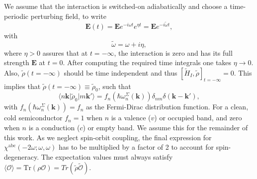 We assume that the interaction is switched-on adiabatically and choose a
time-periodic perturbing field, to write
\begin{equation}\label{efield}
\mathbf{E}(t)
= \mathbf{E} e^{-i\omega t}e^{\eta t}
= \mathbf{E} e^{-i\tilde{\omega} t},
\end{equation}
with
\begin{equation}\label{got}
\tilde{\omega} =\omega + i\eta,
\end{equation} 
where $\eta > 0$ assures that at $t = -\infty$, the interaction is zero and has
its full strength $\mathbf{E}$ at $t = 0$. After computing the required time
integrals one takes $\eta\to 0$. Also, $\tilde{\rho}(t = -\infty)$ should be
time independent and thus $[\tilde{H}_{I},\tilde{\rho}]_{t = -\infty} = 0$. This
implies that $\tilde{\rho}(t = -\infty)\equiv\tilde{\rho}_{0}$, such that
\begin{equation}\label{nrhon}
\langle n\mathbf{k}\vert \tilde{\rho}_{0} \vert m\mathbf{k}'\rangle
= f_{n}(\hbar\omega^{\Sigma}_{n}(\mathbf{k}))
\delta_{nm}\delta(\mathbf{k}-\mathbf{k}'),
\end{equation}
with $f_{n}(\hbar\omega^{\Sigma}_{n}(\mathbf{k})) = f_{n}$ as the Fermi-Dirac
distribution function. For a clean, cold semiconductor $f_{n}=1$ when $n$ is a
valence ($v$) or occupied band, and zero when $n$ is a conduction ($c$) or empty
band. We assume this for the remainder of this work. As we neglect spin-orbit
coupling, the final expression for $\chi^{\mathrm{abc}}(-2\omega;\omega,\omega)$
has to be multiplied by a factor of 2 to account for spin-degeneracy. The
expectation values must always satisfy $\langle\mathcal{O}\rangle =
\mathrm{Tr}({\rho}\mathcal{O}) = Tr(\tilde{\rho}\tilde{\mathcal{O}})$.

